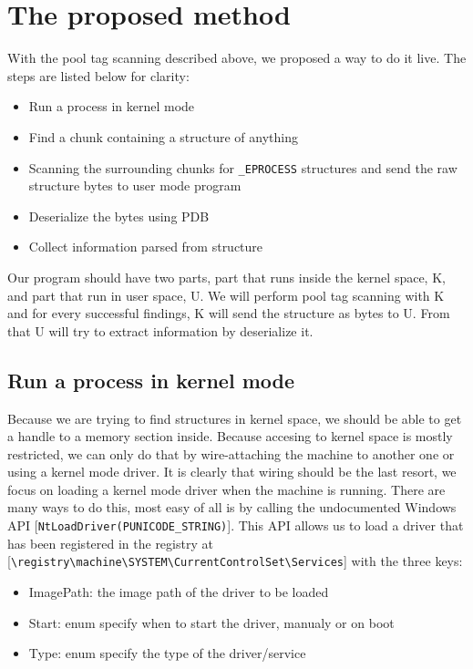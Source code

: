 \chapter[The proposed method]{The proposed method}

With the pool tag scanning described above, we proposed a way to do it live. The steps are listed below for clarity:

\begin{itemize}
  \item Run a process in kernel mode
  \item Find a chunk containing a structure of anything
  \item Scanning the surrounding chunks for \texttt{\_EPROCESS} structures and send the raw structure bytes to user mode program
  \item Deserialize the bytes using PDB
  \item Collect information parsed from structure
\end{itemize}

Our program should have two parts, part that runs inside the kernel space, K, and part that run in user space, U. We will perform pool tag scanning with K and for every successful findings, K will send the structure as bytes to U. From that U will try to extract information by deserialize it.

\section[Run a process in kernel mode]{Run a process in kernel mode}

Because we are trying to find structures in kernel space, we should be able to get a handle to a memory section inside. Because accesing to kernel space is mostly restricted, we can only do that by wire-attaching the machine to another one or using a kernel mode driver. It is clearly that wiring should be the last resort, we focus on loading a kernel mode driver when the machine is running. There are many ways to do this, most easy of all is by calling the undocumented Windows API [\texttt{NtLoadDriver(PUNICODE\_STRING)}]. This API allows us to load a driver that has been registered in the registry at [\texttt{\textbackslash registry\textbackslash machine\textbackslash SYSTEM\textbackslash CurrentControlSet\textbackslash Services}] with the three keys:

\begin{itemize}
  \item ImagePath: the image path of the driver to be loaded
  \item Start: enum specify when to start the driver, manualy or on boot
  \item Type: enum specify the type of the driver/service
\end{itemize}

